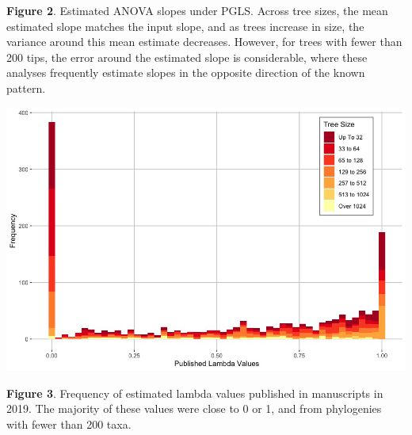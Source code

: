\documentclass[
]{article}
\begin{document}
\singlespacing \textbf{Figure 2}. Estimated ANOVA slopes under PGLS.
Across tree sizes, the mean estimated slope matches the input slope, and
as trees increase in size, the variance around this mean estimate
decreases. However, for trees with fewer than 200 tips, the error around
the estimated slope is considerable, where these analyses frequently
estimate slopes in the opposite direction of the known pattern.
\hfill\break

\newpage

\includegraphics[width=0.95\linewidth]{Fig3}

\singlespacing \textbf{Figure 3}. Frequency of estimated lambda values
published in manuscripts in 2019. The majority of these values were
close to 0 or 1, and from phylogenies with fewer than 200 taxa.
\end{document}
